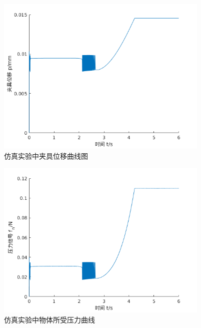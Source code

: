 \begin{figure}[!ht]
  \centering
  \includegraphics[width=10.2cm]{chapter04/pic/p_f}
  \caption{\label{fig:p_f}
    仿真实验中夹具位移曲线图}
  \vspace{-0.3cm}
\end{figure}

\begin{figure}[!ht]
  \centering
  \includegraphics[width=10.2cm]{chapter04/pic/fn_f}
  \caption{\label{fig:fn_f}
    仿真实验中物体所受压力曲线}
  \vspace{-0.3cm}
\end{figure}


